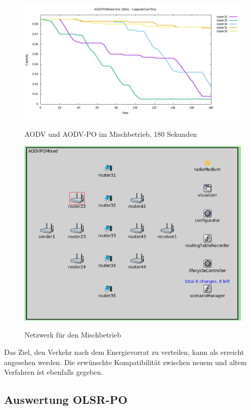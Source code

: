 \begin{figure}
  \centering
  \includegraphics[scale=0.45]{bilder/av11.png} \\
  \caption{AODV und AODV-PO im Mischbetrieb, 180 Sekunden}
  \label{image:omnet:olsr:av11}
\end{figure}

\begin{figure}
  \centering
  \includegraphics[scale=0.35]{bilder/netmixed.png} \\
  \caption{Netzwerk für den Mischbetrieb}
  \label{image:omnet:olsr:netmixed}
\end{figure}

Das Ziel, den Verkehr nach dem Energievorrat zu verteilen, kann als erreicht angesehen werden. Die erwünschte Kompatibilität zwischen neuem und altem Verfahren ist ebenfalls gegeben.

\subsection{Auswertung OLSR-PO}
\label{chapter:auswertung:versuche-olsr}

